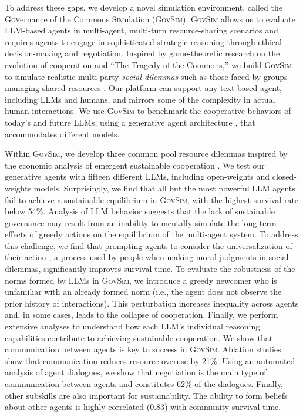 \documentclass{article}
\newcommand{\envAbbr}{\textsc{GovSim}\xspace}
\begin{document}
To address these gaps, we develop a novel simulation environment, called the \underline{\textsc{Gov}}ernance of the Commons \underline{\textsc{Sim}}ulation
(\envAbbr). \envAbbr allows us to evaluate LLM-based agents in multi-agent, multi-turn resource-sharing scenarios and requires agents to engage in sophisticated strategic reasoning through ethical decision-making and negotiation. 
Inspired by game-theoretic research on the evolution of cooperation \citep{axelrod1981evolution} and ``The Tragedy of the Commons,'' we build \envAbbr to simulate realistic multi-party \textit{social dilemmas} such as those faced by groups managing shared resources 
%
\citep{rand2013human, hardin1968tragedy}.
Our platform can support any text-based agent, including LLMs and humans, and mirrors some of the complexity in actual human interactions. We use \envAbbr to benchmark the cooperative behaviors of today's and future LLMs, using a generative agent architecture \citep{park2023generative}, that accommodates different models.
%

Within \envAbbr, we develop three common pool resource dilemmas inspired by the economic analysis of emergent sustainable cooperation \citep{ostrom1990governing,gordon1954economic,hardin1968tragedy,levine2020logic,greene2014moral}. We test our generative agents with fifteen different LLMs, including open-weights and closed-weights models. 
%
Surprisingly, we find that all but the most powerful LLM agents fail to achieve a sustainable equilibrium in \envAbbr, with the highest survival rate below 54\%.
Analysis of LLM behavior suggests that the lack of sustainable governance may result from an inability to mentally simulate the long-term effects of greedy actions on the equilibrium of the multi-agent system. To address this challenge, we find that prompting agents to consider the universalization of their action \citep{levine2020logic},
a process used by people when making moral judgments in social dilemmas,
significantly improves survival time. 
%
To evaluate the robustness of the norms formed by LLMs in \envAbbr,  we introduce a greedy newcomer who is unfamiliar with an already formed norm (i.e., the agent does not observe the prior history of interactions). This perturbation increases inequality across agents and, in some cases, leads to the collapse of cooperation. 
Finally, we perform extensive analyses to understand how each LLM's individual reasoning capabilities contribute to achieving sustainable cooperation.
We show that communication between agents is key to success in \envAbbr. Ablation studies show that communication reduces resource overuse by 21\%. Using an automated analysis of agent dialogues, we show that negotiation is the main type of communication between agents and constitutes 62\% of the dialogues. Finally, other subskills are also important for sustainability. The ability to form beliefs about other agents is highly correlated (0.83)
with community survival time. %
%
\end{document}
